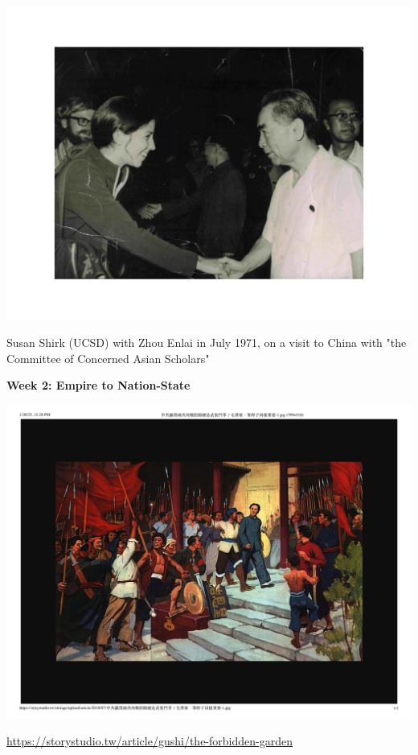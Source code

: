 \documentclass[
  10pt,
  ignorenonframetext,
]{beamer}
\begin{document}
\begin{frame}
\begin{center}\includegraphics[width=0.9\linewidth]{Figs/shirk71} \end{center}
\vspace{0.1cm}
\begin{center}
\scriptsize
\small
Susan Shirk (UCSD) with Zhou Enlai in July 1971, on a visit to China with "the Committee of Concerned Asian Scholars"
\end{center}
\end{frame}

\begin{frame}
\begin{center}
\textbf{Week 2: Empire to Nation-State}
\end{center}
\vspace{0.3cm}

\begin{center}\includegraphics[width=0.7\linewidth]{Figs/theme2} \end{center}
\begin{center}
\footnotesize
\url{https://storystudio.tw/article/gushi/the-forbidden-garden}
\end{center}
\end{frame}
\end{document}
